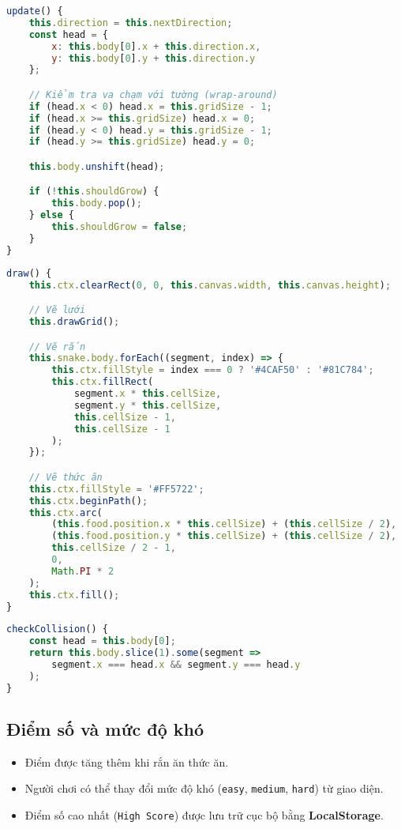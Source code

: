 \documentclass[a4paper, 12pt]{article}
\begin{document}
\begin{lstlisting}[language=JavaScript, caption={Phương thức cập nhật vị trí của rắn}]
update() {
    this.direction = this.nextDirection;
    const head = {
        x: this.body[0].x + this.direction.x,
        y: this.body[0].y + this.direction.y
    };

    // Kiểm tra va chạm với tường (wrap-around)
    if (head.x < 0) head.x = this.gridSize - 1;
    if (head.x >= this.gridSize) head.x = 0;
    if (head.y < 0) head.y = this.gridSize - 1;
    if (head.y >= this.gridSize) head.y = 0;

    this.body.unshift(head);

    if (!this.shouldGrow) {
        this.body.pop();
    } else {
        this.shouldGrow = false;
    }
}
\end{lstlisting}

\begin{lstlisting}[language=JavaScript, caption={Hàm khởi tạo và cập nhật đồ họa}]
draw() {
    this.ctx.clearRect(0, 0, this.canvas.width, this.canvas.height);

    // Vẽ lưới
    this.drawGrid();

    // Vẽ rắn
    this.snake.body.forEach((segment, index) => {
        this.ctx.fillStyle = index === 0 ? '#4CAF50' : '#81C784';
        this.ctx.fillRect(
            segment.x * this.cellSize,
            segment.y * this.cellSize,
            this.cellSize - 1,
            this.cellSize - 1
        );
    });

    // Vẽ thức ăn
    this.ctx.fillStyle = '#FF5722';
    this.ctx.beginPath();
    this.ctx.arc(
        (this.food.position.x * this.cellSize) + (this.cellSize / 2),
        (this.food.position.y * this.cellSize) + (this.cellSize / 2),
        this.cellSize / 2 - 1,
        0,
        Math.PI * 2
    );
    this.ctx.fill();
}
\end{lstlisting}

\begin{lstlisting}[language=JavaScript, caption={Phương thức kiểm tra va chạm giữa đầu và thân rắn}]
checkCollision() {
    const head = this.body[0];
    return this.body.slice(1).some(segment =>
        segment.x === head.x && segment.y === head.y
    );
}
\end{lstlisting}

\subsection{Điểm số và mức độ khó}
\begin{itemize}
    \item Điểm được tăng thêm khi rắn ăn thức ăn.
    \item Người chơi có thể thay đổi mức độ khó (\texttt{easy}, \texttt{medium}, \texttt{hard}) từ giao diện.
    \item Điểm số cao nhất (\texttt{High Score}) được lưu trữ cục bộ bằng \textbf{LocalStorage}.
\end{itemize}
\end{document}
